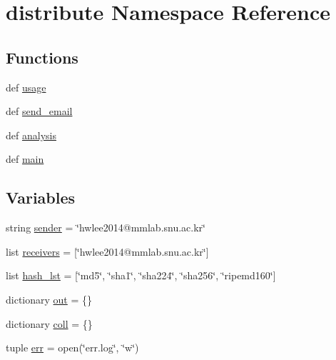 \hypertarget{namespacedistribute}{\section{distribute Namespace Reference}
\label{namespacedistribute}
}
\subsection*{Functions}
\begin{DoxyCompactItemize}
\item 
def \hyperlink{namespacedistribute_a8a4b27922b5ec99cec9f91f0e0247e5f}{usage}
\item 
def \hyperlink{namespacedistribute_a5945d7222c0755f7be322ca8590ec934}{send\-\_\-email}
\item 
def \hyperlink{namespacedistribute_a60cee99fea3ec2f821e8c7dae90cd7d2}{analysis}
\item 
def \hyperlink{namespacedistribute_a6b2930696840e81e2e1c5a658a3d7d1c}{main}
\end{DoxyCompactItemize}
\subsection*{Variables}
\begin{DoxyCompactItemize}
\item 
string \hyperlink{namespacedistribute_ac09955ef2f9ddce318160b4d887ad075}{sender} = \char`\"{}hwlee2014@mmlab.\-snu.\-ac.\-kr\char`\"{}
\item 
list \hyperlink{namespacedistribute_aa94e38b30b74ed3c56dc343fc6ab4e04}{receivers} = \mbox{[}\char`\"{}hwlee2014@mmlab.\-snu.\-ac.\-kr\char`\"{}\mbox{]}
\item 
list \hyperlink{namespacedistribute_ad7ab67bcd426b40cd157285e243cf831}{hash\-\_\-lst} = \mbox{[}\char`\"{}md5\char`\"{}, \char`\"{}sha1\char`\"{}, \char`\"{}sha224\char`\"{}, \char`\"{}sha256\char`\"{}, \char`\"{}ripemd160\char`\"{}\mbox{]}
\item 
dictionary \hyperlink{namespacedistribute_a18a9f9bdb4fbe8e39a3d6e2d6fa7854e}{out} = \{\}
\item 
dictionary \hyperlink{namespacedistribute_a8415b42a9f6c94b948983c90918e75a2}{coll} = \{\}
\item 
tuple \hyperlink{namespacedistribute_a9cb137df933cf742770fc5f96504190e}{err} = open(\char`\"{}err.\-log\char`\"{}, \char`\"{}w\char`\"{})
\end{DoxyCompactItemize}


